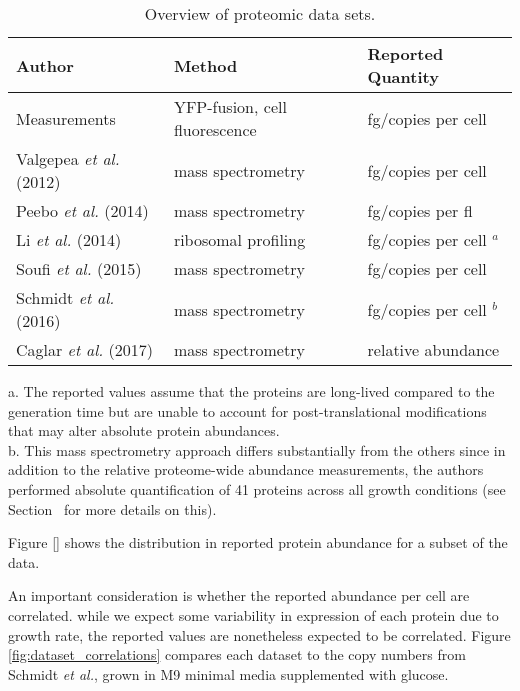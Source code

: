 \begin{table}[bt]
\caption{\label{tab:datasets}Overview of proteomic data sets.}
\begin{tabular}{l l l }
\toprule
Author & Method & Reported Quantity \\
\midrule
Measurements  & YFP-fusion, cell fluorescence    & fg/copies per cell      \\
Valgepea \textit{et al.} (2012)   & mass spectrometry                & fg/copies per cell      \\
Peebo \textit{et al.} (2014)      & mass spectrometry                & fg/copies per fl        \\
Li \textit{et al.} (2014)         & ribosomal profiling              & fg/copies per cell $^a$ \\
Soufi \textit{et al.} (2015)      & mass spectrometry                & fg/copies per cell      \\
Schmidt \textit{et al.} (2016)    & mass spectrometry                & fg/copies per cell $^b$ \\
Caglar \textit{et al.} (2017)     & mass spectrometry                & relative abundance      \\
\bottomrule
\end{tabular}

\medskip
a. The reported values assume that the proteins are long-lived compared to the generation time
but are unable to account for post-translational modifications that may alter absolute protein abundances.
\\
b. This mass spectrometry approach differs substantially from the others since in addition to
the relative proteome-wide abundance measurements, the authors performed absolute quantification of
41 proteins across all growth conditions (see Section~ for more details on this).
\end{table}


Figure \ref{} shows the distribution in reported protein abundance for   a  subset
of  the data.

An important consideration is whether the reported abundance per cell are correlated. while
we expect some variability in expression of each protein due to growth rate, the reported
values are nonetheless expected to be correlated. Figure \ref{fig:dataset_correlations} compares each dataset to the copy numbers from Schmidt \textit{et al.}, grown in M9 minimal media supplemented with glucose.
%
%
%
